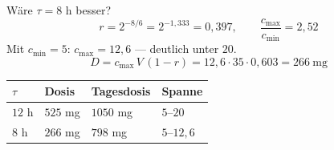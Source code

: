 \begin{aufgabe}
Wäre $\tau = 8$ h besser?
\[ r = 2^{-8/6} = 2^{-1{,}333} = 0{,}397, \qquad \frac{c_{\max}}{c_{\min}} = 2{,}52 \]
Mit $c_{\min} = 5$: $c_{\max} = 12{,}6$ --- deutlich unter $20$.
\[ D = c_{\max}\,V\,(1-r) = 12{,}6 \cdot 35 \cdot 0{,}603 = 266\ \mathrm{mg} \]

\begin{center}
\renewcommand{\arraystretch}{1.48}
\begin{tabular}{@{}P{2.0cm}P{2.0cm}P{2.2cm}P{2.2cm}@{}}
\toprule
$\tau$ & \textbf{Dosis} & \textbf{Tagesdosis} & \textbf{Spanne}\\
\midrule
$12$ h & $525$ mg & $1050$ mg & $5$--$20$\\
$8$ h & $266$ mg & $798$ mg & $5$--$12{,}6$\\
\bottomrule
\end{tabular}
\end{center}

\begin{center}
\begin{minipage}{0.86\textwidth}
\end{minipage}
\end{center}
\end{aufgabe}

